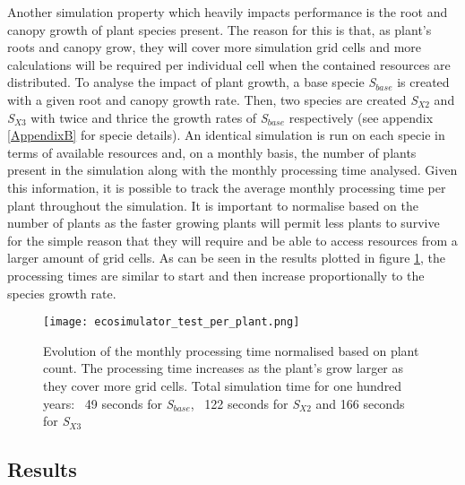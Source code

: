 Another simulation property which heavily impacts performance is the root and canopy growth of plant species present. The reason for this is that, as plant's roots and canopy grow, they will cover more simulation grid cells and more calculations will be required per individual cell when the contained resources are distributed. To analyse the impact of plant growth, a base specie \textit{S$_{base}$} is created with a given root and canopy growth rate. Then, two species are created \textit{S$_{X2}$} and \textit{S$_{X3}$} with twice and thrice the growth rates of \textit{S$_{base}$} respectively (see appendix \ref{AppendixB} for specie details). An identical simulation is run on each specie in terms of available resources and, on a monthly basis, the number of plants present in the simulation along with the monthly processing time analysed. Given this information, it is possible to track the average monthly processing time per plant throughout the simulation. It is important to normalise based on the number of plants as the faster growing plants will permit less plants to survive for the simple reason that they will require and be able to access resources from a larger amount of grid cells. As can be seen in the results plotted in figure \ref{fig:ecosimulator_test_per_plant}, the processing times are similar to start and then increase proportionally to the species growth rate.

\begin{figure}
\center
	\texttt{[image: ecosimulator\_test\_per\_plant.png]}
	\caption{ Evolution of the monthly processing time normalised based on plant count. The processing time increases as the plant's grow larger as they cover more grid cells. Total simulation time for one hundred years: ~49 seconds for \textit{S$_{base}$}, ~122 seconds for \textit{S$_{X2}$} and 166 seconds for \textit{S$_{X3}$}}
	\label{fig:ecosimulator_test_per_plant}
\end{figure}

\subsection{Results}

